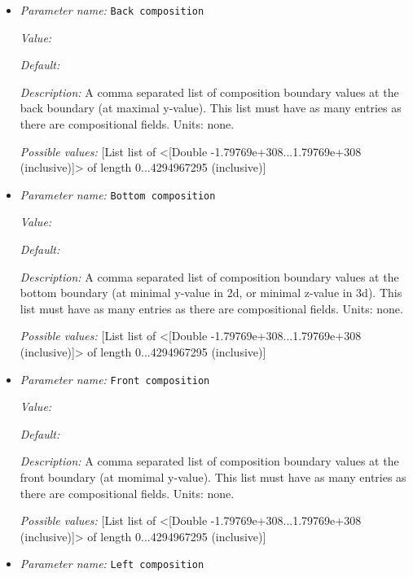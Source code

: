 \begin{itemize}
\item {\it Parameter name:} {\tt Back composition}
\label{parameters:Boundary composition model/Box/Back composition}


{\it Value:} 


{\it Default:} 


{\it Description:} A comma separated list of composition boundary values at the back boundary (at maximal y-value). This list must have as many entries as there are compositional fields. Units: none.


{\it Possible values:} [List list of <[Double -1.79769e+308...1.79769e+308 (inclusive)]> of length 0...4294967295 (inclusive)]
\item {\it Parameter name:} {\tt Bottom composition}
\label{parameters:Boundary composition model/Box/Bottom composition}


{\it Value:} 


{\it Default:} 


{\it Description:} A comma separated list of composition boundary values at the bottom boundary (at minimal y-value in 2d, or minimal z-value in 3d). This list must have as many entries as there are compositional fields. Units: none.


{\it Possible values:} [List list of <[Double -1.79769e+308...1.79769e+308 (inclusive)]> of length 0...4294967295 (inclusive)]
\item {\it Parameter name:} {\tt Front composition}
\label{parameters:Boundary composition model/Box/Front composition}


{\it Value:} 


{\it Default:} 


{\it Description:} A comma separated list of composition boundary values at the front boundary (at momimal y-value). This list must have as many entries as there are compositional fields. Units: none.


{\it Possible values:} [List list of <[Double -1.79769e+308...1.79769e+308 (inclusive)]> of length 0...4294967295 (inclusive)]
\item {\it Parameter name:} {\tt Left composition}
\label{parameters:Boundary composition model/Box/Left composition}



\end{itemize}
